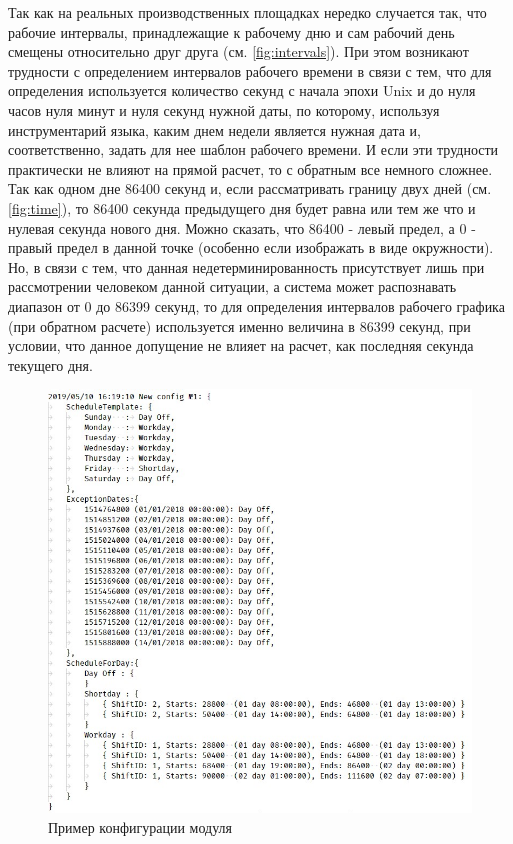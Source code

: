 \indent Так как на реальных производственных площадках нередко случается так, что рабочие интервалы, принадлежащие к рабочему дню и сам рабочий день смещены относительно друг друга (см. \ref{fig:intervals}).
При этом возникают трудности с определением интервалов рабочего времени в связи с тем, что для определения используется количество секунд с начала эпохи Unix и до нуля часов нуля минут и нуля секунд нужной даты, по которому, используя инструментарий языка, каким днем недели является нужная дата и, соответственно, задать для нее шаблон рабочего времени.
И если эти трудности практически не влияют на прямой расчет, то с обратным все немного сложнее.
Так как одном дне 86400 секунд и, если рассматривать границу двух дней (см. \ref{fig:time}), то 86400 секунда предыдущего дня будет равна или тем же что и нулевая секунда нового дня.
Можно сказать, что 86400 - левый предел, а 0 - правый предел в данной точке (особенно если изображать в виде окружности).
Но, в связи с тем, что данная недетерминированность присутствует лишь при рассмотрении человеком данной ситуации, а система может распознавать диапазон от 0 до 86399 секунд, то для определения интервалов рабочего графика (при обратном расчете) используется именно величина в 86399 секунд, при условии, что данное допущение не влияет на расчет, как последняя секунда текущего дня.

\begin{figure}[ht]
	\includegraphics[scale=0.6]{pics/scheduleConfigExample.png}
	\caption{Пример конфигурации модуля}
	\label{fig:config}
	\centering
\end{figure}

